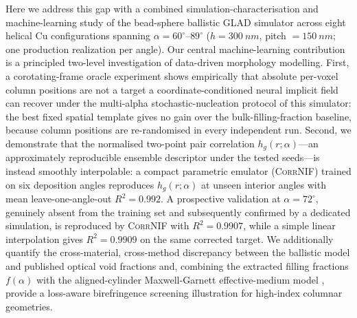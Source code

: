 \documentclass[aip,amsmath,amssymb,reprint]{revtex4-1}
\newcommand{\dang}{\ensuremath{\alpha}}
\begin{document}
Here we address this gap with a combined simulation-characterisation and
machine-learning study of the bead-sphere ballistic GLAD simulator
across eight helical Cu configurations spanning $\dang = 60^{\circ}$--$89^{\circ}$
($h = \SI{300}{nm}$, pitch $= \SI{150}{nm}$; one production realization per
angle).
Our central machine-learning contribution is a principled two-level
investigation of data-driven morphology modelling.
First, a corotating-frame oracle experiment shows empirically that
absolute per-voxel column positions are not a target a coordinate-conditioned
neural implicit field can recover under the multi-alpha stochastic-nucleation
protocol of this simulator: the best fixed spatial template gives no gain
over the bulk-filling-fraction baseline, because column positions are
re-randomised in every independent run.
Second, we demonstrate that the normalised two-point pair correlation
  $h_g(r;\dang)$---an approximately reproducible ensemble descriptor under
  the tested seeds---is instead smoothly interpolable: a compact parametric
  emulator (\textsc{CorrNIF}) trained on six deposition angles reproduces
  $h_g(r;\dang)$ at unseen interior angles with mean leave-one-angle-out
  $R^2 = 0.992$.
A prospective validation at $\dang = 72^{\circ}$, genuinely absent from
the training set and subsequently confirmed by a dedicated simulation,
  is reproduced by \textsc{CorrNIF} with $R^2 = 0.9907$, while a simple
  linear interpolation gives $R^2 = 0.9909$ on the same corrected target.
We additionally quantify the cross-material, cross-method discrepancy
between the ballistic model and published optical void fractions and,
combining the extracted filling fractions $f(\dang)$ with the
aligned-cylinder Maxwell-Garnett effective-medium model \citep{maxwell1904},
provide a loss-aware birefringence screening illustration for high-index
columnar geometries.
\end{document}
